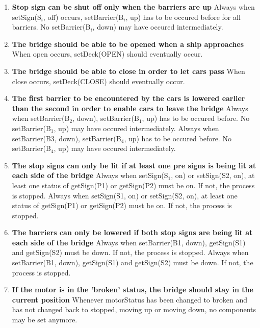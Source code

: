 \begin{enumerate}
	\item \textbf{Stop sign can be shut off only when the barriers are up}
	Always when setSign(S$_i$, off) occurs, setBarrier(B$_i$, up) has to be occured before for all barriers. No setBarrier(B$_i$, down) may have occured intermediately.

	\item \textbf{The bridge should be able to be opened when a ship approaches}
	When open occurs, setDeck(OPEN) should eventually occur.

	\item \textbf{The bridge should be able to close in order to let cars pass}
	When close occurs, setDeck(CLOSE) should eventually occur.

	\item \textbf{The first barrier to be encountered by the cars is lowered earlier than the second in order to enable cars to leave the bridge}
	Always when setBarrier(B$_2$, down), setBarrier(B$_1$, up) has to be occured before. No setBarrier(B$_1$, up) may have occured intermediately.
	Always when setBarrier(B3, down), setBarrier(B$_4$, up) has to be occured before. No setBarrier(B$_4$, up) may have occured intermediately.

	\item \textbf{The stop signs can only be lit if at least one pre signs is being lit at each side of the bridge}
	Always when setSign(S$_1$, on) or setSign(S2, on), at least one status of getSign(P1) or getSign(P2) must be on. If not, the process is stopped.
	Always when setSign(S1, on) or setSign(S2, on), at least one status of getSign(P1) or getSign(P2) must be on. If not, the process is stopped.

	\item \textbf{The barriers can only be lowered if both stop signs are being lit at each side of the bridge}
	Always when setBarrier(B1, down), getSign(S1) and getSign(S2) must be down. If not, the process is stopped.
	Always when setBarrier(B1, down), getSign(S1) and getSign(S2) must be down. If not, the process is stopped.

	\item \textbf{If the motor is in the 'broken' status, the bridge should stay in the current position}
	Whenever motorStatus has been changed to broken and has not changed back to stopped, moving up or moving down, no components may be set anymore.

\end{enumerate}
